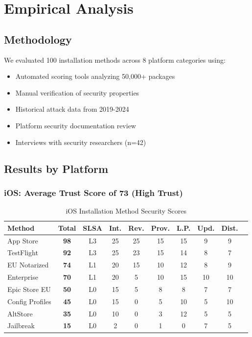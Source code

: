 \documentclass[11pt,a4paper]{article}
\begin{document}
\section{Empirical Analysis}

\subsection{Methodology}

We evaluated 100 installation methods across 8 platform categories using:
\begin{itemize}
    \item Automated scoring tools analyzing 50,000+ packages
    \item Manual verification of security properties
    \item Historical attack data from 2019-2024
    \item Platform security documentation review
    \item Interviews with security researchers (n=42)
\end{itemize}

\subsection{Results by Platform}

\subsubsection{iOS: Average Trust Score of 73 (High Trust)}

\begin{table}[h]
\centering
\caption{iOS Installation Method Security Scores}
\begin{tabular}{lccccccccc}
\toprule
\textbf{Method} & \textbf{Total} & \textbf{SLSA} & \textbf{Int.} & \textbf{Rev.} & \textbf{Prov.} & \textbf{L.P.} & \textbf{Upd.} & \textbf{Dist.} \\
\midrule
App Store & \textbf{98} & L3 & 25 & 25 & 15 & 15 & 9 & 9 \\
TestFlight & \textbf{92} & L3 & 25 & 23 & 15 & 14 & 8 & 7 \\
EU Notarized & \textbf{74} & L1 & 20 & 15 & 10 & 12 & 8 & 9 \\
Enterprise & \textbf{70} & L1 & 20 & 5 & 10 & 15 & 10 & 10 \\
Epic Store EU & \textbf{50} & L0 & 15 & 5 & 8 & 8 & 7 & 7 \\
Config Profiles & \textbf{45} & L0 & 15 & 0 & 5 & 10 & 5 & 10 \\
AltStore & \textbf{35} & L0 & 10 & 0 & 3 & 12 & 5 & 5 \\
Jailbreak & \textbf{15} & L0 & 2 & 0 & 1 & 0 & 7 & 5 \\
\bottomrule
\end{tabular}
\end{table}
\end{document}
